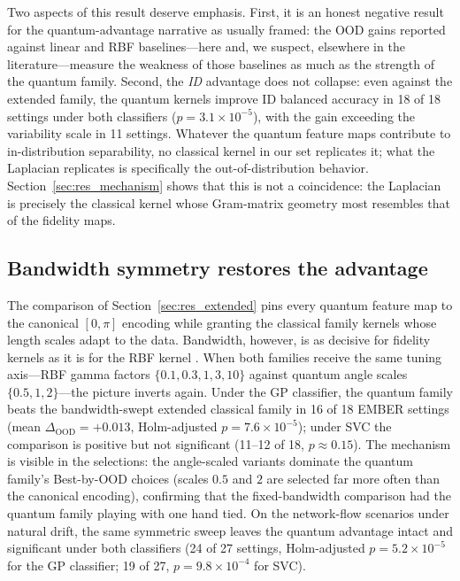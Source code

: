 \documentclass[journal]{IEEEtran}
\begin{document}
Two aspects of this result deserve emphasis. First, it is an honest negative result for the quantum-advantage narrative as usually framed: the OOD gains reported against linear and RBF baselines---here and, we suspect, elsewhere in the literature---measure the weakness of those baselines as much as the strength of the quantum family. Second, the \emph{ID} advantage does not collapse: even against the extended family, the quantum kernels improve ID balanced accuracy in 18 of 18 settings under both classifiers ($p=3.1\times10^{-5}$), with the gain exceeding the variability scale in 11 settings. Whatever the quantum feature maps contribute to in-distribution separability, no classical kernel in our set replicates it; what the Laplacian replicates is specifically the out-of-distribution behavior. Section~\ref{sec:res_mechanism} shows that this is not a coincidence: the Laplacian is precisely the classical kernel whose Gram-matrix geometry most resembles that of the fidelity maps.

\subsection{Bandwidth symmetry restores the advantage}
\label{sec:res_bandwidth}

The comparison of Section~\ref{sec:res_extended} pins every quantum feature map to the canonical $[0,\pi]$ encoding while granting the classical family kernels whose length scales adapt to the data. Bandwidth, however, is as decisive for fidelity kernels as it is for the RBF kernel \cite{shaydulin2022bandwidth,canatar2023bandwidth}. When both families receive the same tuning axis---RBF gamma factors $\{0.1,0.3,1,3,10\}$ against quantum angle scales $\{0.5,1,2\}$---the picture inverts again.
Under the GP classifier, the quantum family beats the bandwidth-swept extended classical family in 16 of 18 EMBER settings (mean $\Delta_{\mathrm{OOD}}=+0.013$, Holm-adjusted $p=7.6\times10^{-5}$); under SVC the comparison is positive but not significant (11--12 of 18, $p\approx0.15$). The mechanism is visible in the selections: the angle-scaled variants dominate the quantum family's Best-by-OOD choices (scales $0.5$ and $2$ are selected far more often than the canonical encoding), confirming that the fixed-bandwidth comparison had the quantum family playing with one hand tied. On the network-flow scenarios under natural drift, the same symmetric sweep leaves the quantum advantage intact and significant under both classifiers (24 of 27 settings, Holm-adjusted $p=5.2\times10^{-5}$ for the GP classifier; 19 of 27, $p=9.8\times10^{-4}$ for SVC).
\end{document}

